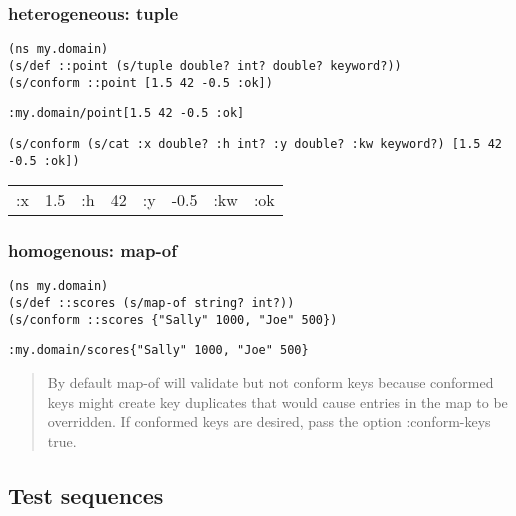 \documentclass[10pt,oneside,x11names]{article}
\begin{document}
\subsubsection{heterogeneous: tuple}
\label{sec:org3f6b622}

\begin{verbatim}
(ns my.domain)
(s/def ::point (s/tuple double? int? double? keyword?))
(s/conform ::point [1.5 42 -0.5 :ok])
\end{verbatim}

\begin{verbatim}
:my.domain/point[1.5 42 -0.5 :ok]
\end{verbatim}


\begin{verbatim}
(s/conform (s/cat :x double? :h int? :y double? :kw keyword?) [1.5 42 -0.5 :ok])
\end{verbatim}

\begin{center}
\begin{tabular}{lrlrlrll}
:x & 1.5 & :h & 42 & :y & -0.5 & :kw & :ok\\
\end{tabular}
\end{center}

\subsubsection{homogenous: map-of}
\label{sec:org16ae3a2}

\begin{verbatim}
(ns my.domain)
(s/def ::scores (s/map-of string? int?))
(s/conform ::scores {"Sally" 1000, "Joe" 500})
\end{verbatim}

\begin{verbatim}
:my.domain/scores{"Sally" 1000, "Joe" 500}
\end{verbatim}


\begin{quote}
By default map-of will validate but not conform keys because conformed keys
might create key duplicates that would cause entries in the map to be
overridden. If conformed keys are desired, pass the option :conform-keys true.
\end{quote}

\subsection{Test sequences}
\label{sec:org2201790}
\end{document}
